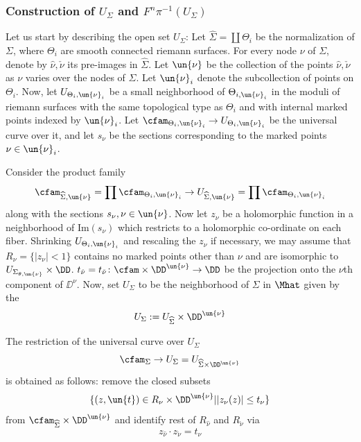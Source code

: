 \documentclass[a4paper,10pt]{amsart}
\begin{document}

\subsubsection{Construction of $U_{\Sigma}$ and $F^n \pi^{-1}(U_{\Sigma})$}\label{gammasubsubsect}
Let us start by describing the open set $U_{\Sigma}$: Let $\widehat{\Sigma} = \coprod \Theta_i$ be the normalization of $\Sigma$, where $\Theta_i$ are smooth connected riemann surfaces. For every node $\nu$ of $\Sigma$, denote by $\hat{\nu}, \check{\nu}$ its pre-images in $\widehat{\Sigma}$. Let $\un{\nu}$ be the collection of the points $\hat{\nu}, \check{\nu}$ as $\nu$ varies over the nodes of $\Sigma$. Let $\un{\nu}_i$ denote the subcollection of points on $\Theta_i$. Now, let $U_{\Theta_i,\un{\nu}_i}$ be a small neighborhood of $\Theta_{i,\un{\nu}_i}$ in the moduli of riemann surfaces with the same topological type as $\Theta_i$ and with internal marked points indexed by $\un{\nu}_i$. Let $\cfam_{\Theta_i, \un{\nu}_i} \to U_{\Theta_i,\un{\nu}_i}$ be the universal curve over it, and let $s_\nu$ be the sections corresponding to the marked points $\nu \in \un{\nu}_i$.

Consider the product family 
\[ \cfam_{\widehat{\Sigma}, \un{\nu}} = \prod \cfam_{\Theta_i,\un{\nu}_i} \to U_{\widehat{\Sigma}, \un{\nu}} =  \prod \cfam_{\Theta_i, \un{\nu}_i}\]
along with the sections $s_{\nu}, \nu \in \un{\nu}$. Now let $z_\nu$ be a holomorphic function in a neighborhood of Im$(s_{\nu})$ which restricts to a holomorphic co-ordinate on each fiber. Shrinking $U_{\Theta_i,\un{\nu}_i}$ and rescaling the $z_{\nu}$ if necessary, we may assume that $R_{\nu} = \{ |z_{\nu}| <1\}$ contains no marked points other than $\nu$ and are isomorphic to $U_{\Sigma_{\theta,\un{\nu}}} \times \DD$. $t_{\hat{\nu}} = t_{\check{\nu}} \colon \cfam \times \DD^{\un{\nu}} \to \DD$ be the projection onto the $\nu$th component of $\DD^{\nu}$. Now, set $U_{\Sigma}$ to be the  neighborhood of $\Sigma$ in $\Mhat$ given by the 
\[ U_{\Sigma} := U_{\widehat{\Sigma}} \times \DD^{\un{\nu}} \]


The restriction of the universal curve over $U_{\Sigma}$
\[ \cfam_{\Sigma} \to U_{\Sigma} = U_{\widehat{\Sigma} \times \DD^{\un{\nu}}} \]
is obtained as follows: remove the closed subsets 
\[ \{(z,\un{t}) \in R_{\nu} \times \DD^{\un{\nu}} | |z_{\nu}(z)| \leq t_{\nu} \} \]
from $\cfam_{\widehat{\Sigma}} \times \DD^{\un{\nu}}$ and identify rest of $R_{\hat{\nu}}$ and $R_{\check{\nu}}$ via 
\[ z_{\hat{\nu}} \cdot z_{\check{\nu}} = t_{\nu} \]
\end{document}
